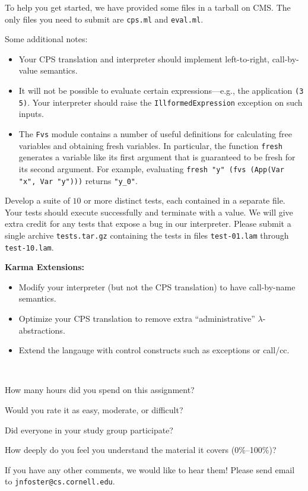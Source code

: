 \documentclass[10pt]{article}
\begin{document}
\begin{exercise}
To help you get started, we have provided some files in a tarball on
CMS. The only files you need to submit are \texttt{cps.ml}
and \texttt{eval.ml}.

Some additional notes:
\begin{itemize}
\item Your CPS translation and interpreter should implement  
left-to-right, call-by-value semantics.
\item It will not be possible to evaluate certain expressions---e.g., 
the application \texttt{(3 5)}. Your interpreter should raise
the \texttt{IllformedExpression} exception on such inputs.
\item The \texttt{Fvs} module contains a number of useful definitions 
for calculating free variables and obtaining fresh variables. In
particular, the function \texttt{fresh} generates a variable like its
first argument that is guaranteed to be fresh for its second
argument. For example, evaluating \texttt{fresh "y" (fvs (App(Var "x",
Var "y")))} returns \texttt{"y\_0"}.
\end{itemize}
\end{exercise}

\begin{exercise}
Develop a suite of $10$ or more distinct tests, each contained in a
separate file. Your tests should execute successfully and terminate
with a value. We will give extra credit for any tests that expose a
bug in our interpreter. Please submit a single archive
\texttt{tests.tar.gz} containing the tests in files \texttt{test-01.lam}
through \texttt{test-10.lam}.
\end{exercise}

\bigskip

\noindent \textbf{Karma Extensions:}
\begin{itemize}
\item Modify your interpreter (but not the CPS translation) to have call-by-name semantics.
\item Optimize your CPS translation to remove extra ``administrative'' $\lambda$-abstractions. 
\item Extend the langauge with control constructs such as exceptions or call/cc.
\end{itemize}

\begin{debriefing} \hfill\\[-4ex]
\begin{enumerate*}
\item How many hours did you spend on this assignment? 
\item Would you rate it as easy, moderate, or difficult? 
\item Did everyone in your study group participate? 
\item How deeply do you feel you understand the material it covers (0\%--100\%)? 
\item If you have any other comments, we would like to hear them!
  Please send email to \texttt{jnfoster@cs.cornell.edu}.
\end{enumerate*}
\end{debriefing}
\end{document}
